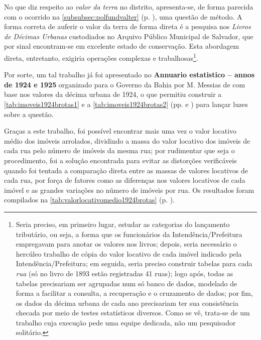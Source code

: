 No que diz respeito ao \textit{valor da terra} no distrito, apresenta-se, de forma parecida com o ocorrido na \autoref{subsubsec:polfundvalter} (p. \pageref{subsubsec:polfundvalter}), uma questão de método. A forma correta de auferir o valor da terra de forma direta é a pesquisa nos \textit{Livros de Décimas Urbanas} custodiados no Arquivo Público Municipal de Salvador, que por sinal encontram-se em excelente estado de conservação. Esta abordagem direta, entretanto, exigiria operações complexas e trabalhosas\footnote{Seria preciso, em primeiro lugar, estudar as categorias do lançamento tributário, ou seja, a forma que os funcionários da Intendência/Prefeitura empregavam para anotar os valores nos livros; depois, seria necessário o hercúleo trabalho de cópia do valor locativo de cada imóvel indicado pela Intendência/Prefeitura; em seguida, seria preciso construir tabelas para cada \textit{rua} (só no livro de 1893 estão registradas 41 ruas); logo após, todas as tabelas precisariam ser agrupadas num só banco de dados, modelado de forma a facilitar a consulta, a recuperação e o cruzamento de dados; por fim, os dados da décima urbana de cada ano precisariam ter sua consistência checada por meio de testes estatísticos diversos. Como se vê, trata-se de um trabalho cuja execução pede uma equipe dedicada, não um pesquisador solitário.}.

Por sorte, um tal trabalho já foi apresentado no \textbf{Annuario estatistico – annos de 1924 e 1925} organizado para o Governo da Bahia por M. Messias de  com base nos valores da décima urbana de 1924, o que permitiu construir a \autoref{tab:imoveis1924brotas1} e a \autoref{tab:imoveis1924brotas2} (pp. \pageref{tab:imoveis1924brotas1} e \pageref{tab:imoveis1924brotas2}) para lançar luzes sobre a questão. 




Graças a este trabalho, foi possível encontrar mais uma vez o valor locativo médio dos imóveis arrolados, dividindo a massa do valor locativo dos imóveis de cada rua pelo número de imóveis da mesma rua; por rudimentar que seja o procedimento, foi a solução encontrada para evitar as distorções verificáveis quando foi tentada a comparação direta entre as massas de valores locativos de cada rua, por força de fatores como as diferenças nos valores locativos de cada imóvel e as grandes variações no número de imóveis por rua. Os resultados foram compilados na \autoref{tab:valorlocativomedio1924brotas} (p. \pageref{tab:valorlocativomedio1924brotas}).

